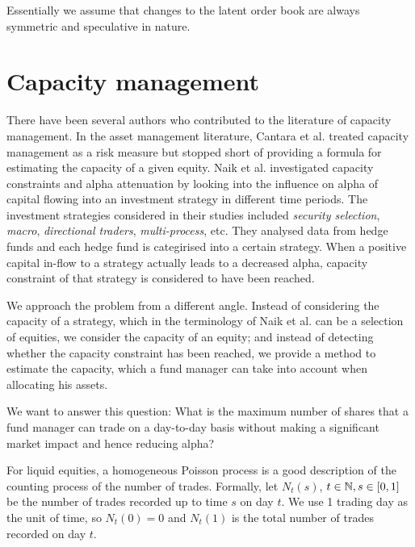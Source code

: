 Essentially we assume that changes to the latent order book are always
symmetric and speculative in nature.


\section{Capacity management}
There have been several authors who contributed to the literature of
capacity management. In the asset management literature,
Cantara et al. \cite{Cantara2016} treated capacity management as a
risk measure but stopped short of providing a formula for estimating
the capacity of a given equity. Naik et al. \cite{EUFM:EUFM353}
investigated capacity constraints and alpha attenuation by looking
into the influence on alpha of capital flowing into an investment
strategy in different time periods. The investment strategies
considered in their studies included {\it security selection}, {\it
  macro}, {\it directional traders}, {\it multi-process}, etc. They
analysed data from hedge funds and each hedge fund is categirised into
a certain strategy. When a positive capital in-flow to a strategy
actually leads to a decreased alpha, capacity constraint of that
strategy is considered to have been reached.


We approach the problem from a different angle. Instead of considering
the capacity of a strategy, which in the terminology of Naik et
al. \cite{EUFM:EUFM353} can be a selection of equities, we consider
the capacity of an equity; and instead of detecting whether the
capacity constraint has been reached, we provide a method to estimate
the capacity, which a fund manager can take into account when
allocating his assets.

We want to answer this question: What is the maximum number of shares
that a fund manager can trade on a day-to-day basis without
making a significant market impact and hence reducing alpha?

For liquid equities, a homogeneous Poisson process is a good
description of the counting process of the number of trades. Formally,
let $N_t(s)$, $t \in \mathbb N, s \in [0, 1]$ be the number of trades
recorded up to time $s$ on day $t$. We use 1 trading day as the unit
of time, so $N_t(0) = 0$ and $N_t(1)$ is the total number of trades
recorded on day $t$.


